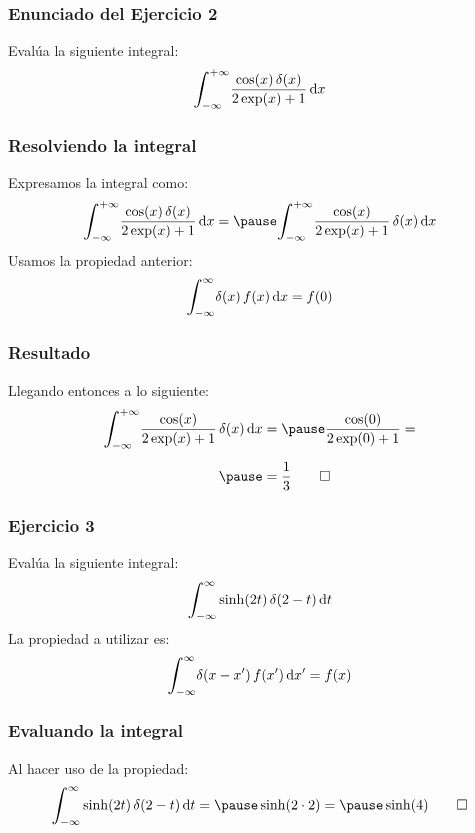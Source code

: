 \documentclass[12pt]{beamer}
\begin{document}
\begin{frame}
\frametitle{Enunciado del Ejercicio 2}
Evalúa la siguiente integral:
\pause
\begin{align*}
\scaleint{6ex}_{\bs -\infty}^{+\infty} \dfrac{\cos (x) \, \delta (x)}{2 \exp(x) + 1}  \dd{x}
\end{align*}
\end{frame}
\begin{frame}
\frametitle{Resolviendo la integral}
Expresamos la integral como:
\pause
\begin{eqnarray*}
\begin{aligned}
\scaleint{6ex}_{\bs -\infty}^{+\infty} \dfrac{\cos (x) \, \delta (x)}{2 \exp(x) + 1} \dd{x} = \pause  
\scaleint{6ex}_{\bs -\infty}^{+\infty} \dfrac{\cos (x)}{2 \exp(x) + 1} \, \delta (x) \dd{x}
\end{aligned}
\end{eqnarray*}
\pause
Usamos la propiedad anterior:
\begin{align*}
\scaleint{6ex}_{\bs -\infty}^{\infty} \delta (x) \, f (x) \dd{x} = f (0)
\end{align*}
\end{frame}
\begin{frame}
\frametitle{Resultado}
Llegando entonces a lo siguiente:
\pause
\begin{eqnarray*}
\begin{aligned}
\scaleint{6ex}_{\bs -\infty}^{+\infty} \dfrac{\cos (x)}{2 \exp(x) + 1} \, \delta (x) \dd{x} &= \pause \dfrac{\cos (0)}{2 \exp (0) + 1} = \\[0.5em] \pause
&= \dfrac{1}{3} \qed
\end{aligned}
\end{eqnarray*}
\end{frame}
\begin{frame}
\frametitle{Ejercicio 3}
Evalúa la siguiente integral:
\pause
\begin{align*}
\scaleint{6ex}_{\bs -\infty}^{\infty} \sinh (2 t) \, \delta (2 - t) \dd{t}
\end{align*}
\pause
La propiedad a utilizar es:
\pause
\begin{align*}
\scaleint{6ex}_{\bs -\infty}^{\infty} \delta (x - \pderivada{x}) \, f (\pderivada{x}) \dd{\pderivada{x}} = f (x)
\end{align*}
\end{frame}
\begin{frame}
\frametitle{Evaluando la integral}
Al hacer uso de la propiedad:
\pause
\begin{eqnarray*}
\begin{aligned}
\scaleint{6ex}_{\bs -\infty}^{\infty} \sinh (2 t) \, \delta (2 - t) \dd{t} = \pause \sinh (2 \cdot 2) = \pause \sinh (4) \qed
\end{aligned}
\end{eqnarray*}
\end{frame}
\end{document}
